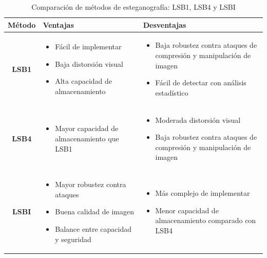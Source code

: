 \documentclass[a4paper,12pt]{article}
\begin{document}
\begin{itemize}
		\begin{table}[H]
			\centering
			\begin{tabular}{|c|p{7cm}|p{7cm}|}
				\hline
				\textbf{Método} & \textbf{Ventajas} & \textbf{Desventajas} \\
				\hline
				\textbf{LSB1} & 
				\begin{itemize}
					\item Fácil de implementar
					\item Baja distorsión visual
					\item Alta capacidad de almacenamiento
				\end{itemize} &
				\begin{itemize}
					\item Baja robustez contra ataques de compresión y manipulación de imagen
					\item Fácil de detectar con análisis estadístico
				\end{itemize} \\
				\hline
				\textbf{LSB4} & 
				\begin{itemize}
					\item Mayor capacidad de almacenamiento que LSB1
					
				\end{itemize} &
				\begin{itemize}
					\item Moderada distorsión visual
					\item Baja robustez contra ataques de compresión y manipulación de imagen
				\end{itemize} \\
				\hline
				\textbf{LSBI} & 
				\begin{itemize}
					\item Mayor robustez contra ataques
					\item Buena calidad de imagen
					\item Balance entre capacidad y seguridad
				\end{itemize} &
				\begin{itemize}
					\item Más complejo de implementar
					\item Menor capacidad de almacenamiento comparado con LSB4
				\end{itemize} \\
				\hline
			\end{tabular}
			\caption{Comparación de métodos de esteganografía: LSB1, LSB4 y LSBI}
			\label{tab:comparison}
		\end{table}
		

\end{itemize}
\end{document}
